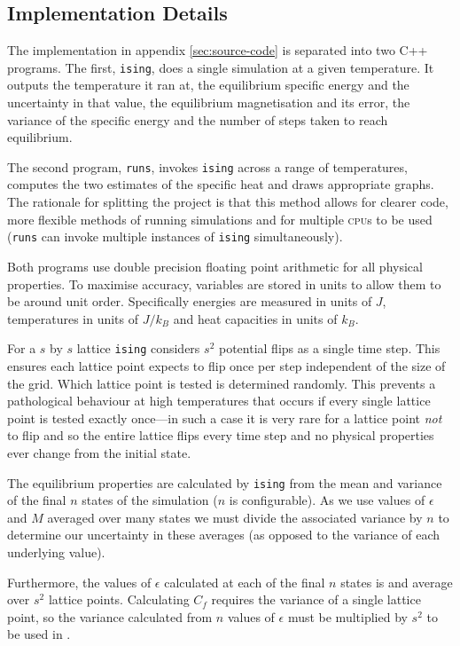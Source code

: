 \documentclass[12pt,a4paper,english]{article}
\begin{document}
\subsection{Implementation Details}
\label{sec:implementation-details}

The implementation in appendix \vref{sec:source-code} is separated into two C++ programs.  The first, \texttt{ising}, does a single simulation at a given temperature. It outputs the temperature it ran at, the equilibrium specific energy and the uncertainty in that value, the equilibrium magnetisation and its error, the variance of the specific energy and the number of steps taken to reach equilibrium.

The second program, \texttt{runs}, invokes \texttt{ising} across a range of temperatures, computes the two estimates of the specific heat and draws appropriate graphs.  The rationale for splitting the project is that this method allows for clearer code, more flexible methods of running simulations and for multiple \textsc{cpu}s to be used (\texttt{runs} can invoke multiple instances of \texttt{ising} simultaneously).

Both programs use double precision floating point arithmetic for all physical properties. To maximise accuracy, variables are stored in units to allow them to be around unit order.  Specifically energies are measured in units of $J$, temperatures in units of $J/k_B$ and heat capacities in units of $k_B$.

For a $s$ by $s$ lattice \texttt{ising} considers $s^2$ potential flips as a single time step.  This ensures each lattice point expects to flip once per step independent of the size of the grid. Which lattice point is tested is determined randomly. This prevents a pathological behaviour at high temperatures that occurs if every single lattice point is tested exactly once---in such a case it is very rare for a lattice point \emph{not} to flip and so the entire lattice flips every time step and no physical properties ever change from the initial state.

The equilibrium properties are calculated by \texttt{ising} from the mean and variance of the final $n$ states of the simulation ($n$ is configurable). As we use values of $\epsilon$ and $M$ averaged over many states we must divide the associated variance by $n$ to determine our uncertainty in these averages (as opposed to the variance of each underlying value).

Furthermore, the values of $\epsilon$ calculated at each of the final $n$ states is and average over $s^2$ lattice points.  Calculating $C_f$ requires the variance of a single lattice point, so the variance calculated from $n$ values of $\epsilon$ must be multiplied by $s^2$ to be used in .
\end{document}
